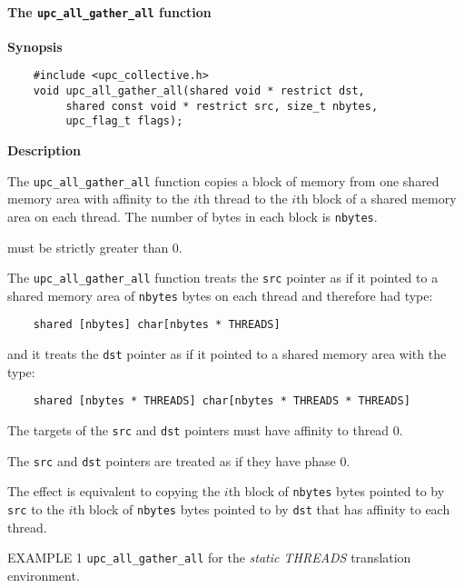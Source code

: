 \paragraph{The {\tt upc\_all\_gather\_all} function}

{\bf Synopsis} 

\npf\vspace{-2.5em} 
\begin{verbatim}
    #include <upc_collective.h>
    void upc_all_gather_all(shared void * restrict dst,
         shared const void * restrict src, size_t nbytes,
         upc_flag_t flags);
\end{verbatim}

{\bf Description} 

\np
The {\tt upc\_all\_gather\_all} function copies a block of memory from one
shared memory area with affinity to the $i$th thread to the $i$th block
of a shared memory area on each thread.
The number of bytes in each block is {\tt nbytes}.

 must be strictly greater than 0.

\np The {\tt upc\_all\_gather\_all} function treats the {\tt src} pointer
as if it pointed to a shared memory area of {\tt nbytes} bytes on each
thread and therefore had type:

\begin{verbatim}
    shared [nbytes] char[nbytes * THREADS]
\end{verbatim}  

\np and it treats the {\tt dst} pointer as if it pointed to a shared
memory area with the type:

\begin{verbatim}
    shared [nbytes * THREADS] char[nbytes * THREADS * THREADS]
\end{verbatim} 

\np The targets of the {\tt src} and {\tt dst} pointers
must have affinity to thread 0.

\np The {\tt src} and {\tt dst} pointers are treated as
if they have phase 0.

\np
The effect is equivalent to copying the
$i$th block of {\tt nbytes} bytes pointed to by {\tt src} to the
$i$th block of {\tt nbytes} bytes pointed to by {\tt dst} that
has affinity to each thread.


\np EXAMPLE 1 {\tt upc\_all\_gather\_all} for the {\em static THREADS}
translation environment.

